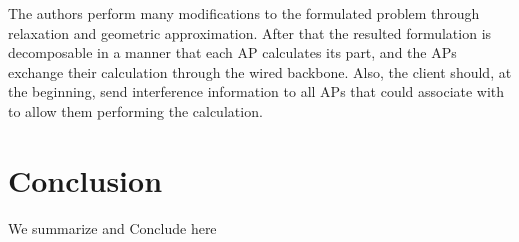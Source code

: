 \documentclass[journal,transmag]{IEEEtran}
\begin{document}
The authors perform many modifications to the formulated problem through relaxation and geometric approximation. After that the resulted formulation is decomposable in a manner that each AP calculates its part, and the APs exchange their calculation through the wired backbone. Also, the client should, at the beginning, send interference information to all APs that could associate with to allow them performing the calculation. \\ 



\section{Conclusion}
\label{Conclusion}
We summarize and Conclude here





\end{document}
